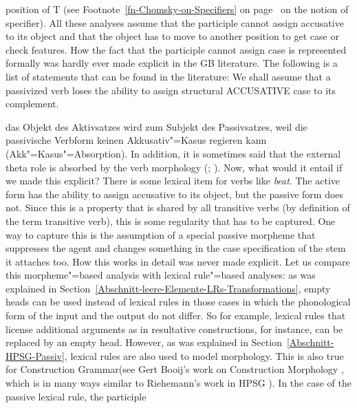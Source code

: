 position of T (see Footnote~\ref{fn-Chomsky-on-Specifiers} on
page~\pageref{fn-Chomsky-on-Specifiers} on the notion of specifier). All these analyses assume that
the participle cannot assign accusative to its object and that the object has to move to another
position to get case or check features. How the fact that the participle cannot assign case is
represented formally was hardly ever made explicit in the GB literature.
The following is a list of statements that can be found in the literature:
\eal
\ex We shall assume that a passivized verb loses the ability to assign structural ACCUSATIVE case to
its complement. \citep[]{Haegeman94a-u}

\ex das Objekt des Aktivsatzes wird zum Subjekt des Passivsatzes, weil die passivische Verbform
keinen Akkusativ"=Kasus regieren kann (Akk"=Kasus"=Absorption). \citep[]{Lohnstein2014a} 
\zl
In addition, it is sometimes said that the external theta role is absorbed by the verb morphology
(\citealp{Jaeggli86a}; 
\citealp[]{Haegeman94a-u}). Now, what would it entail if we made this explicit? There is some
lexical item for verbs like \emph{beat}. The active form has the ability to assign accusative to its
object, but the passive form does not. Since this is a property that is shared by all transitive
verbs (by definition of the term transitive verb), this is some regularity that has to be
captured. One way to capture this is the assumption of a special passive morpheme that suppresses
the agent and changes something in the case specification of the stem it attaches too. How this
works in detail was never made explicit.
Let us compare this morpheme"=based analysis with lexical rule"=based analyses: as was explained in
Section~\ref{Abschnitt-leere-Elemente-LRs-Transformations}, empty heads can be used instead of
lexical rules in those cases in which the phonological form of the input and the output do not
differ. So for example, lexical rules that license additional arguments as in
resultative constructions, for instance, can be replaced by an empty head. However, as was explained in Section~\ref{Abschnitt-HPSG-Passiv}, lexical 
rules are also used to model morphology. This is also true for Construction Grammar\indexcxg (see
Gert Booij's work on Construction Morphology \citeyearpar{Booij2010a}, which is in many ways similar to Riehemann's work in
HPSG \citeyearpar{Riehemann93a,Riehemann98a}). In the case of the passive lexical rule, the participle
